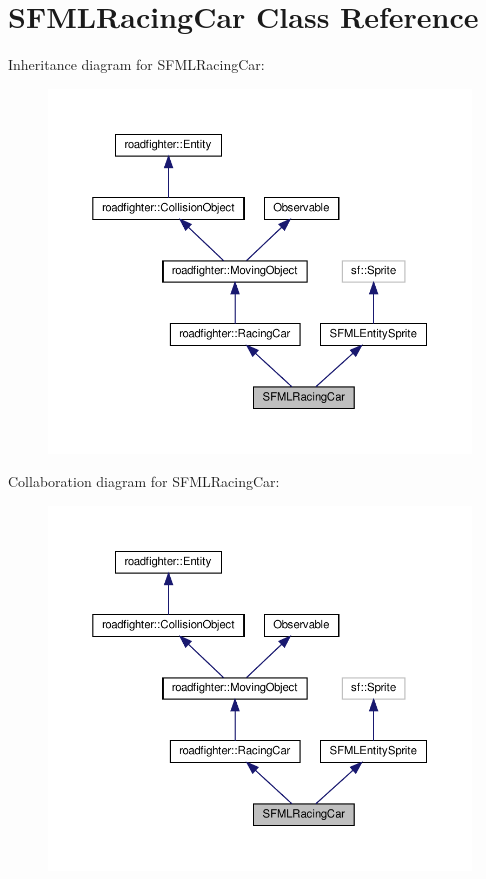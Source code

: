 \hypertarget{classSFMLRacingCar}{}\section{S\+F\+M\+L\+Racing\+Car Class Reference}
\label{classSFMLRacingCar}


Inheritance diagram for S\+F\+M\+L\+Racing\+Car\+:\nopagebreak
\begin{figure}[H]
\begin{center}
\leavevmode
\includegraphics[width=350pt]{classSFMLRacingCar__inherit__graph}
\end{center}
\end{figure}


Collaboration diagram for S\+F\+M\+L\+Racing\+Car\+:\nopagebreak
\begin{figure}[H]
\begin{center}
\leavevmode
\includegraphics[width=350pt]{classSFMLRacingCar__coll__graph}
\end{center}
\end{figure}
